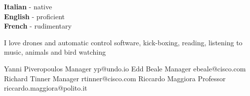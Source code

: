 \documentclass[8pt]{developercv} %
\begin{document}

\begin{minipage}[t]{0.3\textwidth}
	\vspace{-\baselineskip} %

	
	\textbf{Italian} - native\\
	\textbf{English} - proficient\\
	\textbf{French} - rudimentary
\end{minipage}
\hfill
\begin{minipage}[t]{0.3\textwidth}
	\vspace{-\baselineskip} %
	
	
	I love drones and automatic control software, kick-boxing, reading, listening to music, animals and bird watching
\end{minipage}
\hfill
\begin{minipage}[t]{0.3\textwidth}
	\vspace{-\baselineskip} %
\begin{entrylist}
 {Yanni Piveropoulos} {Manager} {yp@undo.io}
 {Edd Beale} {Manager} {ebeale@cisco.com}
 {Richard Tinner} {Manager} {rtinner@cisco.com}
 {Riccardo Maggiora} {Professor} {riccardo.maggiora@polito.it}
\end{entrylist}
\end{minipage}

\end{document}
